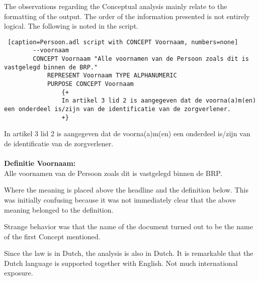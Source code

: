 The observations regarding the Conceptual analysis mainly relate to the formatting of the output.
The order of the information presented is not entirely logical.
The following is noted in the script.
\begin{lstlisting} [caption=Persoon.adl script with CONCEPT Voornaam, numbers=none]
        --voornaam
        CONCEPT Voornaam "Alle voornamen van de Persoon zoals dit is vastgelegd binnen de BRP."
            REPRESENT Voornaam TYPE ALPHANUMERIC
            PURPOSE CONCEPT Voornaam
                {+
                In artikel 3 lid 2 is aangegeven dat de voorna(a)m(en) een onderdeel is/zijn van de identificatie van de zorgverlener.
                +}
\end{lstlisting}
\begin{tcolorbox} [title=Conceptual analysis "Definitie Voornaam"]
In artikel 3 lid 2 is aangegeven dat de voorna(a)m(en) een onderdeel is/zijn van de identificatie van de zorgverlener.\\
\\
\textbf{Definitie Voornaam:}\\
   Alle voornamen van de Persoon zoals dit is vastgelegd binnen de BRP.
\end{tcolorbox}

Where the meaning is placed above the headline and the definition below.
This was initially confusing because it was not immediately clear that the above meaning belonged to the definition.

Strange behavior was that the name of the document turned out to be the name of the first Concept mentioned.

Since the law is in Dutch, the analysis is also in Dutch.
It is remarkable that the Dutch language is supported together with English.
Not much international exposure.


